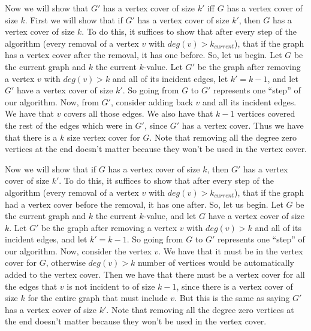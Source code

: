 \documentclass{article}
\begin{document}
Now we will show that $G'$ has a vertex cover of size $k'$ iff $G$ has a vertex
cover of size $k$. First we will show that if $G'$ has a vertex cover of size
$k'$, then $G$ has a vertex cover of size $k$. To do this, it suffices to show
that after every step of the algorithm (every removal of a vertex $v$ with
$deg(v) > k_{current}$), that if the graph has a vertex cover after the
removal, it has one before. So, let us begin. Let $G$ be the
current graph and $k$ the current $k$-value. Let $G'$ be the graph after
removing a vertex $v$ with $deg(v) > k$ and all of its incident edges,
let $k' = k - 1$,  and let $G'$ have a vertex cover of size $k'$. So going from $G$
to $G'$ represents one ``step'' of our algorithm. Now, from $G'$, consider adding back $v$
and all its incident edges. We
have that $v$ covers all those edges. We also have that $k-1$ vertices covered
the rest of the edges which were in $G'$, since $G'$ has a vertex cover.
Thus we have that there is a $k$ size
vertex cover for $G$. Note that removing all the degree zero vertices at the end
doesn't matter because they won't be used in the vertex cover.

Now we will show that if $G$ has a vertex cover of size $k$, then $G'$ has a
vertex cover of size $k'$. To do this, it suffices to show
that after every step of the algorithm (every removal of a vertex $v$ with
$deg(v) > k_{current}$), that if the graph had a vertex cover before the
removal, it has one after. So, let us begin. Let $G$ be the
current graph and $k$ the current $k$-value, and let $G$ have a vertex
cover of size $k$. Let $G'$ be the graph after
removing a vertex $v$ with $deg(v) > k$ and all of its incident edges,
and let $k' = k - 1$. So going from $G$
to $G'$ represents one ``step'' of our algorithm. Now, consider the vertex $v$.
We have that it must be in the vertex cover for $G$, otherwise $deg(v) > k$
number of vertices would be automatically added to the vertex cover. Then we
have that there must be a vertex cover for all the edges that $v$ is not
incident to of size $k - 1$, since there is a vertex cover of size $k$ for the
entire graph that must include $v$. But this is the same as saying $G'$ has a vertex cover of size
$k'$. Note that removing all the degree zero vertices at the end doesn't matter
because they won't be used in the vertex cover.
\newpage

\end{document}
